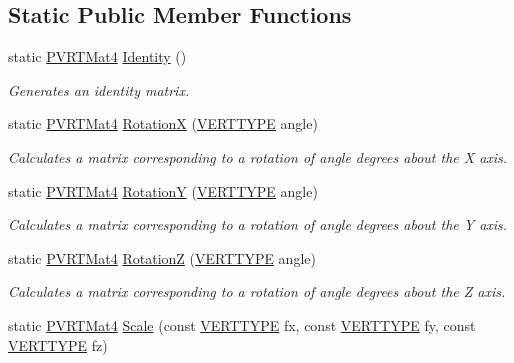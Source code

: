 \subsection*{Static Public Member Functions}
\begin{DoxyCompactItemize}
\item 
static \hyperlink{struct_p_v_r_t_mat4}{P\+V\+R\+T\+Mat4} \hyperlink{struct_p_v_r_t_mat4_aec7e6d87fc29ef245978cbeaeedf15d7}{Identity} ()
\begin{DoxyCompactList}\small\item\em Generates an identity matrix. \end{DoxyCompactList}\item 
static \hyperlink{struct_p_v_r_t_mat4}{P\+V\+R\+T\+Mat4} \hyperlink{struct_p_v_r_t_mat4_a5fe3d2aedca6a9d96110ce0c8566e7af}{Rotation\+X} (\hyperlink{group___a_p_i___o_g_l_e_s_ga06da457b7d3e93368ab904f89e1396be}{V\+E\+R\+T\+T\+Y\+P\+E} angle)
\begin{DoxyCompactList}\small\item\em Calculates a matrix corresponding to a rotation of angle degrees about the X axis. \end{DoxyCompactList}\item 
static \hyperlink{struct_p_v_r_t_mat4}{P\+V\+R\+T\+Mat4} \hyperlink{struct_p_v_r_t_mat4_ae963b3a45f031ed3eb6c56f4ce9e5426}{Rotation\+Y} (\hyperlink{group___a_p_i___o_g_l_e_s_ga06da457b7d3e93368ab904f89e1396be}{V\+E\+R\+T\+T\+Y\+P\+E} angle)
\begin{DoxyCompactList}\small\item\em Calculates a matrix corresponding to a rotation of angle degrees about the Y axis. \end{DoxyCompactList}\item 
static \hyperlink{struct_p_v_r_t_mat4}{P\+V\+R\+T\+Mat4} \hyperlink{struct_p_v_r_t_mat4_a9ff7a65314d7c112229914abf6e703ed}{Rotation\+Z} (\hyperlink{group___a_p_i___o_g_l_e_s_ga06da457b7d3e93368ab904f89e1396be}{V\+E\+R\+T\+T\+Y\+P\+E} angle)
\begin{DoxyCompactList}\small\item\em Calculates a matrix corresponding to a rotation of angle degrees about the Z axis. \end{DoxyCompactList}\item 
static \hyperlink{struct_p_v_r_t_mat4}{P\+V\+R\+T\+Mat4} \hyperlink{struct_p_v_r_t_mat4_a137801b159b6c4b68626513ccd89ec47}{Scale} (const \hyperlink{group___a_p_i___o_g_l_e_s_ga06da457b7d3e93368ab904f89e1396be}{V\+E\+R\+T\+T\+Y\+P\+E} fx, const \hyperlink{group___a_p_i___o_g_l_e_s_ga06da457b7d3e93368ab904f89e1396be}{V\+E\+R\+T\+T\+Y\+P\+E} fy, const \hyperlink{group___a_p_i___o_g_l_e_s_ga06da457b7d3e93368ab904f89e1396be}{V\+E\+R\+T\+T\+Y\+P\+E} fz)

\end{DoxyCompactItemize}
